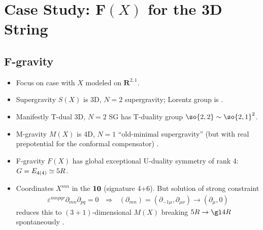 \documentclass[12pt]{article} %
\numberwithin{equation}{section}
\begin{document}
\section{Case Study: $\mathbf F(X)$ for the 3D String}
\noindent

\subsection{F-gravity}
\begin{itemize}
\item Focus on case with $X$ modeled on $\mathbf R^{2,1}$. %
\item Supergravity $S(X)$ is 3D, $N=2$ supergravity; Lorentz group is .
\item Manifestly T-dual 3D, $N=2$ SG has T-duality group $\so{2,2} \sim \so{2,1}^2$.
\item M-gravity $M(X)$ is 4D, $N=1$ ``old-minimal supergravity'' (but with real prepotential for the conformal compensator) \cite{Polacek:2013nla, Linch:2015lwa}.
\item F-gravity $F(X)$ has global exceptional U-duality symmetry of rank 4: $G=E_{4(4)}\simeq \sl5R$.
\item Coordinates $X^{mn}$ in the $\bf 10$ (signature 4+6).
But solution of strong constraint
\begin{align*}
\varepsilon^{mnpqr}\partial_{mn} \partial_{pq} = 0
~~~\Rightarrow ~~~
(\partial_{mn}) = (\partial_{-1\mu}, \partial_{\mu \nu}) \to (\partial_\mu, 0)
\end{align*}
reduces this to $(3+1)$-dimensional $M(X)$ breaking $\sl5R \to \gl4R$ spontaneously \cite{Berman:2012vc}.
\end{itemize}
\end{document}
